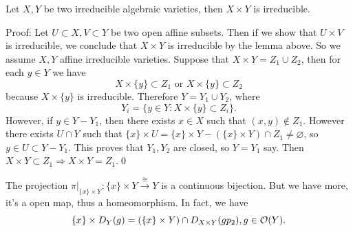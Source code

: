 \begin{dang}
    \begin{proposition}
        Let $X,Y$ be two irreducible algebraic varieties, then $X\times Y$ is irreducible.
    \end{proposition}
\end{dang}
Proof: Let $U\subset X, V\subset Y$ be two open affine subsets. Then if we show that 
$U\times V$ is irreducible, we conclude that $X\times Y$ is irreducible by the lemma above. So we assume 
$X,Y$ affine irreducible varieties. Suppose that 
$X\times Y = Z_1\cup Z_2$, then for each $y\in Y$ we have 
\begin{equation}
    X\times\{y\}\subset Z_1 \text{ or } X\times\{y\}\subset Z_2
\end{equation}
because $X\times \{y\}$ is irreducible. Therefore $Y= Y_1\cup Y_2$, where 
\begin{equation}
    Y_i = \{y\in Y: X\times\{y\}\subset Z_i\}.
\end{equation}
However, if $y\in Y-Y_1$, then there exists $x\in X$ such that $(x,y)\notin Z_1$. However
there exists $U\cap Y$ such that $\{x\}\times U = \{x\}\times Y - (\{x\}\times Y)\cap Z_1\neq\varnothing$, so 
$y\in U\subset Y-Y_1$. This proves that $Y_1,Y_2$ are closed, so $Y=Y_1$ say. Then 
$X\times Y\subset Z_1\Rightarrow X\times Y= Z_1$.\qed 

\begin{remark}
    The projection $\pi|_{\{x\}\times Y}:\{x\}\times Y\overset{\cong}{\rightarrow}Y$ is a continuous bijection. 
    But we have more, it's a open map, thus a homeomorphism. In fact, we have 
    \begin{equation}
        \{x\}\times D_Y(g) = (\{x\}\times Y)\cap D_{X\times Y}(gp_2),g\in\mathcal{O}(Y).
    \end{equation}
\end{remark}


